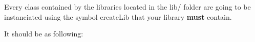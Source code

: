 Every class contained by the libraries located in the {\ttfamily lib/} folder are going to be instanciated using the symbol {\ttfamily create\+Lib} that your library {\bfseries{must}} contain.

It should be as following\+:


\begin{DoxyCode}{0}
\DoxyCodeLine{\{}
\DoxyCodeLine{\}}
\end{DoxyCode}
 